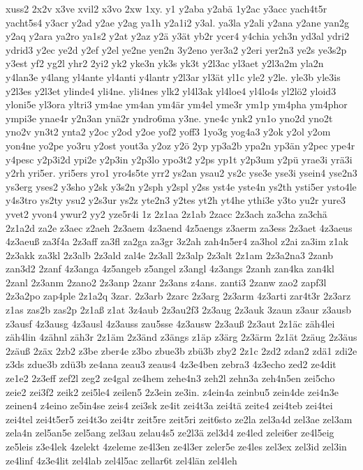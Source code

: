 {xuss2
2x2v
x3ve
xvil2
x3vo
2xw
1xy.
y1
y2aba
y2abä
1y2ac
y3acc
yach4t5r
yacht5s4
y3acr
y2ad
y2ae
y2ag
ya1h
y2a1i2
y3al.
ya3la
y2ali
y2ana
y2ane
yan2g
y2aq
y2ara
ya2ro
ya1s2
y2at
y2az
y2ä
y3ät
yb2r
ycer4
y4chia
ych3n
yd3al
ydri2
ydrid3
y2ec
ye2d
y2ef
y2el
ye2ne
yen2n
3y2eno
yer3a2
y2eri
yer2n3
ye2s
ye3s2p
y3est
yf2
yg2l
yhr2
2yi2
yk2
yke3n
yk3s
yk3t
y2l3ac
yl3aet
y2l3a2m
yla2n
y4lan3e
y4lang
yl4ante
yl4anti
y4lantr
y2l3ar
yl3ät
yl1c
yle2
y2le.
yle3b
yle3is
y2l3es
y2l3et
ylinde4
yli4ne.
yli4nes
ylk2
yl4l3ak
yl4loe4
yl4lo4s
yl2lö2
yloid3
yloni5e
yl3ora
yltri3
ym4ae
ym4an
ym4är
ym4el
yme3r
ym1p
ym4pha
ym4phor
ympi3e
ynae4r
y2n3an
ynä2r
yndro6ma
y3ne.
yne4c
ynk2
yn1o
yno2d
yno2t
yno2v
yn3t2
ynta2
y2oc
y2od
y2oe
yof2
yoff3
1yo3g
yog4a3
y2ok
y2ol
y2om
yon4ne
yo2pe
yo3ru
y2ost
yout3a
y2oz
y2ö
2yp
yp3a2b
ypa2n
yp3än
y2pec
ype4r
y4pesc
y2p3i2d
ypi2e
y2p3in
y2p3lo
ypo3t2
y2ps
yp1t
y2p3um
y2pü
yrae3i
yrä3i
y2rh
yri5er.
yri5ers
yro1
yro4s5te
yrr2
ys2an
ysau2
ys2c
yse3e
yse3i
ysein4
yse2n3
ys3erg
yses2
y3sho
y2sk
y3s2n
y2sph
y2spl
y2ss
yst4e
yste4n
ys2th
ysti5er
ysto4le
y4s3tro
ys2ty
ysu2
y2s3ur
ys2z
yte2n3
y2tes
yt2h
yt4he
ythi3e
y3to
yu2r
yure3
yvet2
yvon4
ywur2
yy2
yze5r4i
1z
2z1aa
2z1ab
2zacc
2z3ach
za3cha
za3chä
2z1a2d
za2e
z3aec
z2aeh
2z3aem
4z3aend
4z5aengs
z3aerm
za3ess
2z3aet
4z3aeus
4z3aeuß
za3f4a
2z3aff
za3fl
za2ga
za3gr
3z2ah
zah4n5er4
za3hol
z2ai
za3im
z1ak
2z3akk
za3kl
2z3alb
2z3ald
zal4e
2z3all
2z3alp
2z3alt
2z1am
2z3a2na3
2zanb
zan3d2
2zanf
4z3anga
4z5angeb
z5angel
z3angl
4z3angs
2zanh
zan4ka
zan4kl
2zanl
2z3anm
2zano2
2z3anp
2zanr
2z3ans
z4ans.
zanti3
2zanw
zao2
zapf3l
2z3a2po
zap4ple
2z1a2q
3zar.
2z3arb
2zarc
2z3arg
2z3arm
4z3arti
zar4t3r
2z3arz
z1as
zas2b
zas2p
2z1aß
z1at
3z4aub
2z3au2f3
2z3aug
2z3auk
3zaun
z3aur
z3ausb
z3ausf
4z3ausg
4z3ausl
4z3auss
zau5sse
4z3ausw
2z3auß
2z3aut
2z1äc
zäh4lei
zäh4lin
4zähnl
zäh3r
2z1äm
2z3änd
z3ängs
z1äp
z3ärg
2z3ärm
2z1ät
2zäug
2z3äus
2zäuß
2zäx
2zb2
z3be
zber4e
z3bo
zbue3b
zbü3b
zby2
2z1c
2zd2
zdan2
zdä1
zdi2e
z3ds
zdue3b
zdü3b
ze4ana
zeau3
zeaus4
4z3e4ben
zebra3
4z3echo
zed2
ze4dit
ze1e2
2z3eff
zef2l
zeg2
ze4gal
ze4hem
zehe4n3
zeh2l
zehn3a
zeh4n5en
zei5cho
zeie2
zei3f2
zeik2
zei5le4
zeilen5
2z3ein
ze3in.
z4ein4a
zeinbu5
zein4de
zei4n3e
zeinen4
z4eino
ze5in4se
zeis4
zei3sk
ze4it
zei4t3a
zei4tä
zeite4
zei4teb
zei4tei
zei4tel
zei4t5er5
zei4t3o
zei4tr
zeit5re
zeit5ri
zeit6sto
ze2la
zel3a4d
zel3ae
zel3am
zela4n
zel5an5e
zel5ang
zel3au
zelau4s5
ze2l3ä
zel3d4
ze4led
zelei6er
ze4l5eig
ze5leis
z3e4lek
4zelekt
4zeleme
ze4l3en
ze4l3er
zeler5e
ze4les
zel3ex
zel3id
zel3in
ze4linf
4z3e4lit
zel4lab
zel4l5ac
zellar6t
zel4län
zel4leh
}
